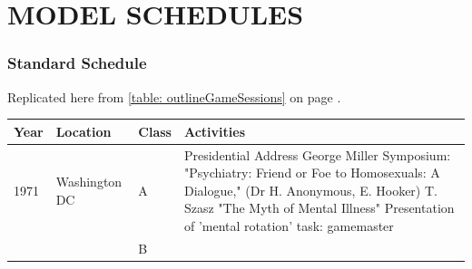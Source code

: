 \pagebreak 

\chapter{MODEL SCHEDULES}
\label{modelschedules}

\subsection{Standard Schedule}
\label{standardschedule}

Replicated here from \ref{table: outlineGameSessions} on page \pageref{table: outlineGameSessions}.

 \begin{longtable}[!t]{ | p{1cm} | p{2cm} | p{1cm} | p{10cm} | }
\hline

\textbf{Year}&\textbf{Location}&\textbf{Class}&\textbf{Activities} \\ \hline
1971&Washington DC&A&Presidential Address\: George Miller \newline
Symposium: "Psychiatry: Friend or Foe to Homosexuals: A Dialogue," (Dr H. Anonymous, E. Hooker)\newline
T. Szasz "The Myth of Mental Illness"\newline
Presentation of 'mental rotation' task: gamemaster\\

&&B&


\end{longtable}
